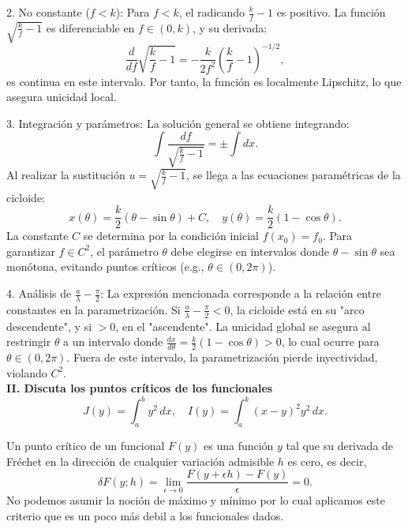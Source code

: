 \documentclass{elsarticle}
\begin{document}
2. No constante (\( f < k \)):
   Para \( f < k \), el radicando \( \frac{k}{f} - 1 \) es positivo. La función \( \sqrt{\frac{k}{f} - 1} \) es diferenciable en \( f \in (0, k) \), y su derivada:  
   \[
   \frac{d}{df} \sqrt{\frac{k}{f} - 1} = -\frac{k}{2f^2} \left(\frac{k}{f} - 1\right)^{-1/2},
   \]  
   es continua en este intervalo. Por tanto, la función es localmente Lipschitz, lo que asegura unicidad local.  

3. Integración y parámetros: 
   La solución general se obtiene integrando:  
   \[
   \int \frac{df}{\sqrt{\frac{k}{f} - 1}} = \pm \int dx.
   \]  
   Al realizar la sustitución \( u = \sqrt{\frac{k}{f} - 1} \), se llega a las ecuaciones paramétricas de la cicloide:  
   \[
   x(\theta) = \frac{k}{2}(\theta - \sin\theta) + C, \quad y(\theta) = \frac{k}{2}(1 - \cos\theta).
   \]  
   La constante \( C \) se determina por la condición inicial \( f(x_0) = f_0 \). Para garantizar \( f \in C^2 \), el parámetro \( \theta \) debe elegirse en intervalos donde \( \theta - \sin\theta \) sea monótona, evitando puntos críticos (e.g., \( \theta \in (0, 2\pi) \)).  

4. Análisis de \( \frac{a}{\lambda} - \frac{\pi}{2} \):
   La expresión mencionada corresponde a la relación entre constantes en la parametrización. Si \( \frac{a}{\lambda} - \frac{\pi}{2} < 0 \), la cicloide está en su "arco descendente", y si \( > 0 \), en el "ascendente". La unicidad global se asegura al restringir \( \theta \) a un intervalo donde \( \frac{dx}{d\theta} = \frac{k}{2}(1 - \cos\theta) > 0 \), lo cual ocurre para \( \theta \in (0, 2\pi) \). Fuera de este intervalo, la parametrización pierde inyectividad, violando \( C^2 \).  \\

\textbf{II. Discuta los puntos críticos de los funcionales  }
\[
J(y) = \int_a^b y^2 \,dx, \quad I(y) = \int_a^k (x - y)^2 y^2 \,dx.
\]  

Un punto crítico de un funcional \( F(y) \) es una función \( y \) tal que su derivada de Fréchet en la dirección de cualquier variación admisible \( h \) es cero, es decir,  
\[
\delta F(y; h) = \lim_{\epsilon \to 0} \frac{F(y + \epsilon h) - F(y)}{\epsilon} = 0.
\]  
No podemos asumir la noción de máximo y mínimo por lo cual aplicamos este criterio que es un poco más debil a los funcionales dados.  \\
\end{document}
